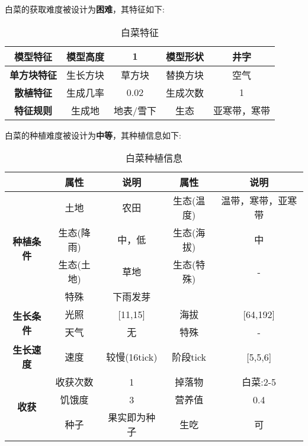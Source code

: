 白菜的获取难度被设计为\textbf{困难}，其特征如下:
\begin{table}[H]
    \centering
    \caption{白菜特征}
    \label{table:白菜特征}
    \setlength{\tabcolsep}{4mm}
    \begin{tabular}{c|cc|cc}
        \toprule
        \textbf{模型特征}   & 模型高度 & 1      & 模型形状 & 井字     \\
        \midrule
        \textbf{单方块特征} & 生长方块 & 草方块 & 替换方块 & 空气     \\
        \midrule
        \textbf{散植特征}   & 生成几率 & 0.02   & 生成次数 & 1        \\
        \midrule
        \textbf{特征规则}   & 生成地   & 地表/雪下   & 生态     & 亚寒带，寒带 \\
        \bottomrule
    \end{tabular}
\end{table}


白菜的种植难度被设计为\textbf{中等}，其种植信息如下:

\begin{table}[H]
    \centering
    \caption{白菜种植信息}
    \label{table:白菜种植信息}
    \setlength{\tabcolsep}{4mm}
    \begin{tabular}{c|cc|cc}
        \toprule
                                           & \textbf{属性} & \textbf{说明} & \textbf{属性} & \textbf{说明} \\
        \midrule
        \multirow{4}{*}{\textbf{种植条件}} & 土地          & 农田          & 生态(温度)    & 温带，寒带，亚寒带    \\
                                           & 生态(降雨)    & 中，低        & 生态(海拔)    & 中            \\
                                           & 生态(土地)    & 草地          & 生态(特殊)    & -             \\
                                           & 特殊          & 下雨发芽         \\
        \midrule
        \multirow{2}{*}{\textbf{生长条件}} & 光照          & [11,15]        & 海拔          & [64,192]      \\
                                           & 天气          & 无            & 特殊          & -             \\
        \midrule
        \textbf{生长速度}                  & 速度          & 较慢(16tick)     & 阶段tick      & [5,5,6]       \\
        \midrule
        \multirow{3}{*}{\textbf{收获}}     & 收获次数      & 1             & 掉落物        & 白菜:2-5      \\
                                           & 饥饿度        & 3             & 营养值        & 0.4           \\
                                           & 种子          & 果实即为种子  & 生吃          & 可 \\
        \bottomrule
    \end{tabular}
\end{table}

